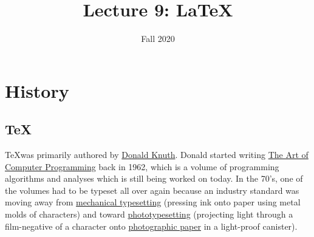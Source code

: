 \documentclass[12pt,letterpaper,twoside]{article}
\begin{document}
\title{Lecture 9: \LaTeX \vspace{-5ex}}
\date{Fall 2020}
\maketitle

\vspace{-6ex}
\section{History}
\vspace{-2.5ex}
\subsection{\TeX}
\TeX was primarily authored by
\href{https://en.wikipedia.org/wiki/Donald_Knuth}{Donald
  Knuth}. Donald started writing
\href{https://en.wikipedia.org/wiki/The_Art_of_Computer_Programming}{The
  Art of Computer Programming} back in 1962, which is a volume of
programming algorithms and analyses which is still being
worked on today. In the 70's, one of the volumes had to be typeset all
over again because an industry standard was moving away from
\href{https://en.wikipedia.org/wiki/Hot_metal_typesetting}{mechanical
  typesetting} (pressing ink onto paper using metal molds of
characters) and toward
\href{https://en.wikipedia.org/wiki/Phototypesetting}{phototypesetting}
(projecting light through a film-negative of a character onto
\href{https://en.wikipedia.org/wiki/Photographic_paper}{photographic
  paper}
in a light-proof canister).
\end{document}
